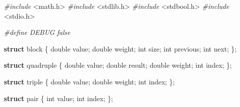 \documentclass[
  12pt,
]{book}
\newenvironment{Shaded}{\begin{snugshade}}{\end{snugshade}}
\newcommand{\DataTypeTok}[1]{\textcolor[rgb]{0.13,0.29,0.53}{#1}}
\newcommand{\ImportTok}[1]{#1}
\newcommand{\KeywordTok}[1]{\textcolor[rgb]{0.13,0.29,0.53}{\textbf{#1}}}
\newcommand{\NormalTok}[1]{#1}
\newcommand{\PreprocessorTok}[1]{\textcolor[rgb]{0.56,0.35,0.01}{\textit{#1}}}
\theoremstyle{definition}
\theoremstyle{definition}
\theoremstyle{definition}
\theoremstyle{definition}
\theoremstyle{remark}
\begin{document}
\begin{Shaded}
\begin{Highlighting}[]

\PreprocessorTok{\#include }\ImportTok{\textless{}math.h\textgreater{}}
\PreprocessorTok{\#include }\ImportTok{\textless{}stdlib.h\textgreater{}}
\PreprocessorTok{\#include }\ImportTok{\textless{}stdbool.h\textgreater{}}
\PreprocessorTok{\#include }\ImportTok{\textless{}stdio.h\textgreater{}}

\PreprocessorTok{\#define DEBUG false}

\KeywordTok{struct}\NormalTok{ block \{}
    \DataTypeTok{double}\NormalTok{ value;}
    \DataTypeTok{double}\NormalTok{ weight;}
    \DataTypeTok{int}\NormalTok{ size;}
    \DataTypeTok{int}\NormalTok{ previous;}
    \DataTypeTok{int}\NormalTok{ next;}
\NormalTok{\};}

\KeywordTok{struct}\NormalTok{ quadruple \{}
    \DataTypeTok{double}\NormalTok{ value;}
    \DataTypeTok{double}\NormalTok{ result;}
    \DataTypeTok{double}\NormalTok{ weight;}
    \DataTypeTok{int}\NormalTok{ index;}
\NormalTok{\};}

\KeywordTok{struct}\NormalTok{ triple \{}
    \DataTypeTok{double}\NormalTok{ value;}
    \DataTypeTok{double}\NormalTok{ weight;}
    \DataTypeTok{int}\NormalTok{ index;}
\NormalTok{\};}

\KeywordTok{struct}\NormalTok{ pair \{}
    \DataTypeTok{int}\NormalTok{ value;}
    \DataTypeTok{int}\NormalTok{ index;}
\NormalTok{\};}


\end{Highlighting}
\end{Shaded}
\end{document}
